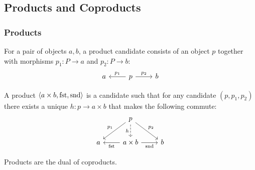 \subsection{Products and Coproducts}

\subsubsection*{Products}

\begin{definition}

	For a pair of objects $a, b$, a product candidate consists of an object $p$
	together with morphisms $p_1: P\to a$ and $p_2:P\to b$:
	\[\begin{tikzcd}[ampersand replacement=\&]
		a \& p \& b
		\arrow["{p_1}"', from=1-2, to=1-1]
		\arrow["{p_2}", from=1-2, to=1-3]
	\end{tikzcd}\]

	A product $\langle a\times b, \mathrm{fst}, \mathrm{snd}\rangle$ is a candidate such that
	for any candidate $(p, p_1, p_2)$ there exists a unique $h: p\to a\times b$
	that makes the following commute:
	\parencite{leinster:basic_category_theory}
	\[\begin{tikzcd}[ampersand replacement=\&]
		\& p \\
		a \& {a\times b} \& b
		\arrow["{\mathrm{fst}}", from=2-2, to=2-1]
		\arrow["{\mathrm{snd}}"', from=2-2, to=2-3]
		\arrow["{p_1}"', from=1-2, to=2-1]
		\arrow["{p_2}", from=1-2, to=2-3]
		\arrow["h"', dashed, from=1-2, to=2-2]
	\end{tikzcd}\]
\end{definition}

\begin{remark}
	Products are the dual of coproducts.
\end{remark}

